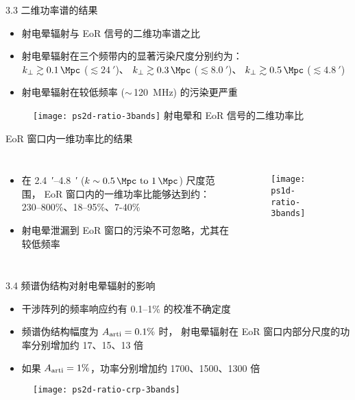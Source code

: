 \documentclass{beamer}
\begin{document}
\begin{frame}{3.3 二维功率谱的结果}
  \begin{itemize}
    \item 射电晕辐射与 EoR 信号的\alert{二维功率谱之比}
    \item 射电晕辐射在三个频带内的显著污染尺度分别约为：\\
      $k_{\perp} \gtrsim \SI{0.1}{\per\Mpc}$
      ($\lesssim \SI{24}{\arcminute}$)、
      $k_{\perp} \gtrsim \SI{0.3}{\per\Mpc}$
      ($\lesssim \SI{8.0}{\arcminute}$)、
      $k_{\perp} \gtrsim \SI{0.5}{\per\Mpc}$
      ($\lesssim \SI{4.8}{\arcminute}$)
    \item 射电晕辐射在较低频率 ($\sim$\,\SI{120}{\MHz}) 的污染更严重
  \end{itemize}

  \begin{figure}
    \centering\footnotesize
    \texttt{[image: ps2d-ratio-3bands]}
    射电晕和 EoR 信号的二维功率比
  \end{figure}
\end{frame}

\begin{frame}[t]
  \begin{alertblock}{EoR 窗口内一维功率比的结果}
  \end{alertblock}
  \begin{columns}
    \begin{itemize}
      \item 在 \SI{2.4}{\arcminute}--\SI{4.8}{\arcminute}
        ($k \sim \SIrange{0.5}{1}{\per\Mpc}$) 尺度范围，
        EoR 窗口内的一维功率比能够达到约：
        230--800\%、18--95\%、7-40\%
      \item 射电晕泄漏到 EoR 窗口的污染不可忽略，尤其在较低频率
    \end{itemize}

    \begin{figure}
      \centering
      \texttt{[image: ps1d-ratio-3bands]}
    \end{figure}
  \end{columns}
\end{frame}

\begin{frame}{3.4 频谱伪结构对射电晕辐射的影响}
  \begin{itemize}
    \item 干涉阵列的频率响应约有 0.1--1\% 的校准不确定度
    \item 频谱伪结构幅度为 $A_{\text{arti}} = 0.1\%$ 时，
      射电晕辐射在 EoR 窗口内部分尺度的功率分别增加约 17、15、13 倍
    \item 如果 $A_{\text{arti}} = 1\%$，功率分别增加约 1700、1500、1300 倍
  \end{itemize}
  \begin{figure}
    \centering
    \texttt{[image: ps2d-ratio-crp-3bands]}
  \end{figure}
\end{frame}
\end{document}
